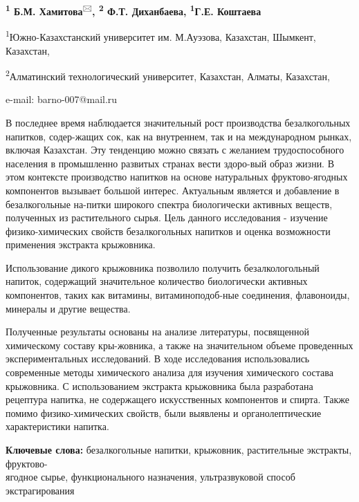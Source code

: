 \begin{center}

{\bfseries \textsuperscript{1} Б.М. Хамитова}\textsuperscript{🖂}{\bfseries ,
\textsuperscript{2} Ф.Т. Диханбаева, \textsuperscript{1}Г.Е. Коштаева}

\textsuperscript{1}Южно-Казахстанский университет им. М.Ауэзова,
Казахстан, Шымкент, Казахстан,

\textsuperscript{2}Алматинский технологический университет, Казахстан,
Алматы, Казахстан,

e-mail: barno-007@mail.ru
\end{center}

В последнее время наблюдается значительный рост производства
безалкогольных напитков, содер-жащих сок, как на внутреннем, так и на
международном рынках, включая Казахстан. Эту тенденцию можно связать с
желанием трудоспособного населения в промышленно развитых странах вести
здоро-вый образ жизни. В этом контексте производство напитков на основе
натуральных фруктово-ягодных компонентов вызывает большой интерес.
Актуальным является и добавление в безалкогольные на-питки широкого
спектра биологически активных веществ, полученных из растительного
сырья. Цель данного исследования - изучение физико-химических свойств
безалкогольных напитков и оценка возможности применения экстракта
крыжовника.

Использование дикого крыжовника позволило получить безалкологольный
напиток, содержащий значительное количество биологически активных
компонентов, таких как витамины, витаминоподоб-ные соединения,
флавоноиды, минералы и другие вещества.

Полученные результаты основаны на анализе литературы, посвященной
химическому составу кры-жовника, а также на значительном объеме
проведенных экспериментальных исследований. В ходе исследования
использовались современные методы химического анализа для изучения
химического состава крыжовника. С использованием экстракта крыжовника
была разработана рецептура напитка, не содержащего искусственных
компонентов и спирта. Также помимо физико-химических свойств, были
выявлены и органолептические характеристики напитка.

{\bfseries Ключевые слова:} безалкогольные напитки, крыжовник, растительные
экстракты, фруктово-\\ягодное сырье, функционального назначения,
ультразвуковой способ экстрагирования

